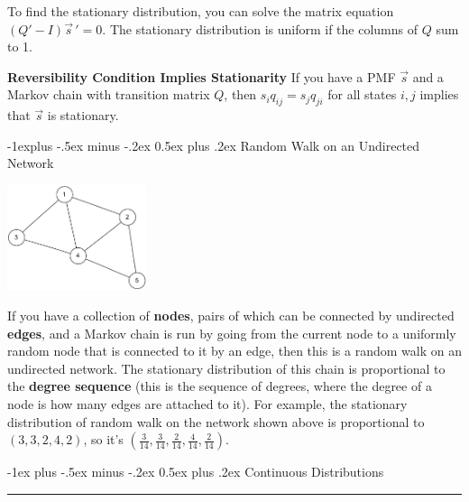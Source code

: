\documentclass[6pt,landscape]{article}
\makeatletter
\renewcommand{\section}{\@startsection{section}{1}{0mm}%
                                {-1ex plus -.5ex minus -.2ex}%
                                {0.5ex plus .2ex}%
                                {\normalfont\large\bfseries}}
\renewcommand{\subsection}{\@startsection{subsection}{2}{0mm}%
                                {-1explus -.5ex minus -.2ex}%
                                {0.5ex plus .2ex}%
                                {\normalfont\normalsize\bfseries}}
\makeatother
\begin{document}
\begin{multicols*}{3}
\smallskip

 To find the stationary distribution, you can solve the matrix equation $(Q' - I){\vec{s}\,}'= 0$. The stationary distribution is uniform if the columns of $Q$ sum to 1.

\smallskip

\textbf{Reversibility Condition Implies Stationarity}  If you have a PMF $\vec{s}$ and a Markov chain with transition matrix $Q$, then $s_iq_{ij} = s_jq_{ji}$ for all states $i, j$ implies that $\vec{s}$ is stationary.

\subsection{Random Walk on an Undirected Network}
 \begin{minipage}{\linewidth}
            \centering
\includegraphics[width=1.6in]{figures/network1.pdf}
        \end{minipage}
\medskip

If you have a collection of \textbf{nodes}, pairs of which can be connected by undirected \textbf{edges}, and a Markov chain is run by going from the current node to a uniformly random node that is connected to it by an edge, then  this is a random walk on an undirected network. The stationary distribution of this chain is proportional to the \textbf{degree sequence} (this is the sequence of degrees, where the degree of a node is how many edges are attached to it). For example, the stationary distribution of random walk on the network shown above is proportional to $(3,3,2,4,2)$, so it's $(\frac{3}{14}, \frac{3}{14}, \frac{2}{14}, \frac{4}{14}, \frac{2}{14})$. 

\section{Continuous Distributions}\smallskip \hrule height 2pt \smallskip


\end{multicols*}
\end{document}
